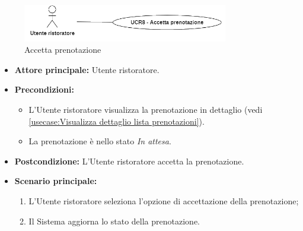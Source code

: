 \label{usecase:Accetta prenotazione}

\begin{figure}[h]
	\centering
	\includegraphics[width=0.8\textwidth]{./uml/UCR8.png} 
	\caption{Accetta prenotazione}
	\label{fig:UCR8}
  \end{figure}

\begin{itemize}
	\item \textbf{Attore principale:} Utente ristoratore.

	\item \textbf{Precondizioni:}
	      \begin{itemize}
		      \item L'Utente ristoratore visualizza la prenotazione in dettaglio (vedi \autoref{usecase:Visualizza dettaglio lista prenotazioni}).

		      \item La prenotazione è nello stato \textit{In attesa}.
	      \end{itemize}

	\item \textbf{Postcondizione:} L'Utente ristoratore accetta la prenotazione.


	\item \textbf{Scenario principale:}
	      \begin{enumerate}
		      \item L'Utente ristoratore seleziona l'opzione di accettazione della prenotazione;

		      \item Il Sistema aggiorna lo stato della prenotazione.
	      \end{enumerate}
\end{itemize}
